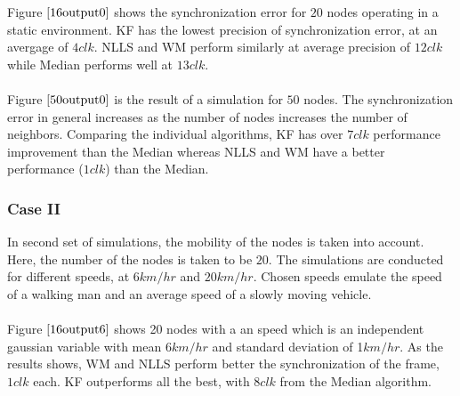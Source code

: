\documentclass[a4paper,10pt]{report}
\begin{document}
Figure $\ref{16output0}$ shows the synchronization error for $20$ nodes operating in a static environment. KF has the lowest precision of synchronization error, at an avergage of $4clk$. NLLS and WM perform similarly at average precision of $12clk$ while Median performs well at $13clk$. \paragraph*{}
Figure $\ref{50output0}$ is the result of a simulation for $50$ nodes. The synchronization error in general increases as the number of nodes increases the number of neighbors. Comparing the individual algorithms, KF has over $7clk$ performance improvement than the Median whereas NLLS and WM have a better performance ($1clk$) than the Median.
\subsubsection{\textbf{Case II}}
In second set of simulations, the mobility of the nodes is taken into account. Here, the number of the nodes is taken to be $20$. The simulations are conducted for different speeds, at $6km/hr$ and $20km/hr$. Chosen speeds emulate the speed of a walking man and an average speed of a slowly moving vehicle.
\paragraph*{}
Figure $\ref{16output6}$ shows 20 nodes with a an speed which is an independent gaussian variable with mean $6km/hr$ and standard deviation of 1$km/hr$. As the results shows, WM and NLLS perform better the synchronization of the frame, $1 clk$ each. KF outperforms all the best, with $8 clk$ from the Median algorithm.
\end{document}
